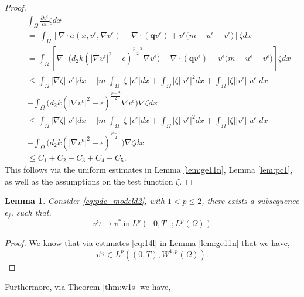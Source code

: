 \documentclass[10pt]{amsart}
\theoremstyle{plain}
\newtheorem{lemma}[theorem]{Lemma}
\theoremstyle{definition}
\begin{document}
\begin{proof}
\begin{eqnarray}
    && \int_{\Omega} \frac{\partial v^{\epsilon}}{\partial t} \zeta dx \nonumber \\
    && = \ \int_{\Omega} [\nabla \cdot a(x,v^{\epsilon},\nabla v^{\epsilon})  - \nabla\cdot (\textbf{q}  v^{\epsilon}) + v^{\epsilon}\Big(m-u^{\epsilon}-v^{\epsilon}\Big)] \zeta dx \nonumber \\
    && = \int_{\Omega} [\nabla \cdot \Big(d_2 k  \left(|\nabla v^{\epsilon}|^{2}+{\epsilon}\right)^{\frac{p-2}{2}}  \nabla v^{\epsilon} \Big)  - \nabla\cdot (\textbf{q}  v^{\epsilon}) + v^{\epsilon}\Big(m-u^{\epsilon}-v^{\epsilon}\Big) ]\zeta dx \nonumber \\
    && \leq \int_{\Omega} |\nabla \zeta| |v^{\epsilon}| dx + |m|\int_{\Omega} | \zeta| |v^{\epsilon}| dx + \int_{\Omega} | \zeta| |v^{\epsilon}|^{2} dx + \int_{\Omega} | \zeta| |v^{\epsilon}||u^{\epsilon}| dx  \nonumber \\
    && + \int_{\Omega}\Big(d_2 k  \left(|\nabla v^{\epsilon}|^{2}+{\epsilon}\right)^{\frac{p-2}{2}}  \nabla v^{\epsilon} \Big) \nabla \zeta dx \nonumber \\
    &&  \leq \int_{\Omega} |\nabla \zeta| |v^{\epsilon}| dx + |m|\int_{\Omega} | \zeta| |v^{\epsilon}| dx + \int_{\Omega} | \zeta| |v^{\epsilon}|^{2} dx + \int_{\Omega} | \zeta| |v^{\epsilon}||u^{\epsilon}| dx  \nonumber \\
    &&+ \int_{\Omega}\Big(d_2 k  \left(|\nabla v^{\epsilon}|^{2}+{\epsilon}\right)^{\frac{p-1}{2}}  \Big) \nabla \zeta dx \nonumber \\
    && \leq C_{1} + C_{2} + C_{3} + C_{4} + C_{5}.
\end{eqnarray}
%
This follows via the uniform estimates in Lemma \ref{lem:ge11n}, Lemma \ref{lem:pc1}, as well as the assumptions on the test function $\zeta$.
\end{proof}


    


\begin{lemma}
\label{lem:vlp}
Consider \eqref{eq:pde_modeld2}, with $ 1 < p \leq 2$, there exists a subsequence ${\epsilon_{j}}$, such that,
 \begin{equation}
v^{\epsilon_{j}} \rightarrow v^{*} \ \mbox{in} \  L^{p}([0,T];L^{p}(\Omega))
\end{equation}

\end{lemma}

\begin{proof}
    We know that via estimates \eqref{eq:14l} in Lemma \ref{lem:ge11n} that we have,
    \begin{equation}
v^{\epsilon_{j}} \in L^{p}((0,T), W^{1,p}(\Omega)).
\end{equation}
\end{proof}
Furthermore, via Theorem \ref{thm:w1s} we have,
\end{document}
